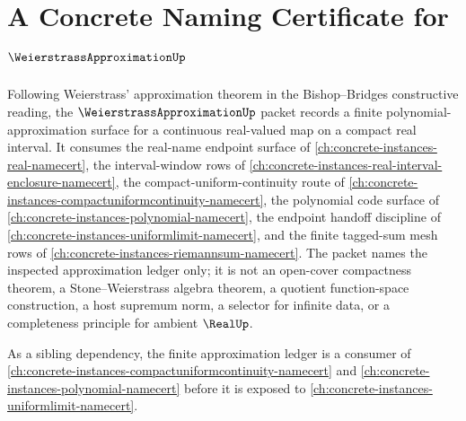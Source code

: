 \chapter{A Concrete Naming Certificate for $\WeierstrassApproximationUp$}
\label{ch:concrete-instances-weierstrass-approximation-namecert}

Following Weierstrass' approximation theorem in the Bishop--Bridges constructive reading, the $\WeierstrassApproximationUp$ packet records a finite polynomial-approximation surface for a continuous real-valued map on a compact real interval. It consumes the real-name endpoint surface of \autoref{ch:concrete-instances-real-namecert}, the interval-window rows of \autoref{ch:concrete-instances-real-interval-enclosure-namecert}, the compact-uniform-continuity route of \autoref{ch:concrete-instances-compactuniformcontinuity-namecert}, the polynomial code surface of \autoref{ch:concrete-instances-polynomial-namecert}, the endpoint handoff discipline of \autoref{ch:concrete-instances-uniformlimit-namecert}, and the finite tagged-sum mesh rows of \autoref{ch:concrete-instances-riemannsum-namecert}. The packet names the inspected approximation ledger only; it is not an open-cover compactness theorem, a Stone--Weierstrass algebra theorem, a quotient function-space construction, a host supremum norm, a selector for infinite data, or a completeness principle for ambient $\RealUp$.

As a sibling dependency, the finite approximation ledger is a consumer of \autoref{ch:concrete-instances-compactuniformcontinuity-namecert} and \autoref{ch:concrete-instances-polynomial-namecert} before it is exposed to \autoref{ch:concrete-instances-uniformlimit-namecert}.

